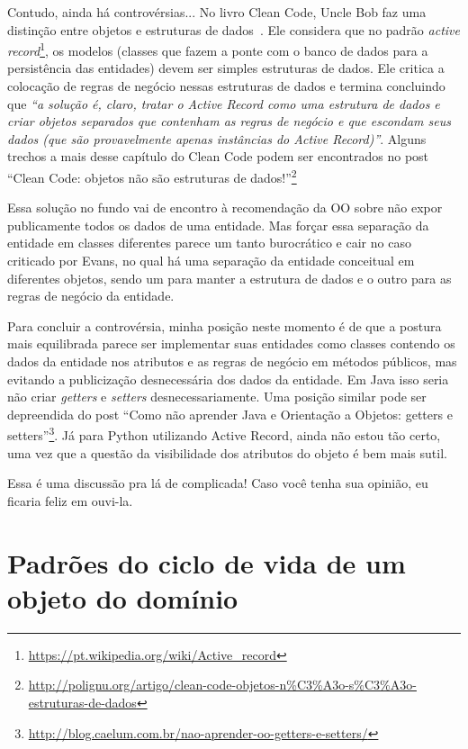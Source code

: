 \documentclass[a4paper, 12pt]{article}
\newcommand{\citacao}[1]{\emph{``#1''}}
\begin{document}
Contudo, ainda há controvérsias... No livro Clean Code, Uncle Bob faz uma distinção entre objetos e estruturas de dados~\cite{Bob2008DataStructures}. Ele considera que no padrão \emph{active record}\footnote{\url{https://pt.wikipedia.org/wiki/Active_record}}, os modelos (classes que fazem a ponte com o banco de dados para a persistência das entidades) devem ser simples estruturas de dados. Ele critica a colocação de regras de negócio nessas estruturas de dados e termina concluindo que \citacao{a solução é, claro, tratar o Active Record como uma estrutura de dados e criar objetos separados que contenham as regras de negócio e que escondam seus dados (que são provavelmente apenas instâncias do Active Record)}. Alguns trechos a mais desse capítulo do Clean Code podem ser encontrados no post ``Clean Code: objetos não são estruturas de dados!''\footnote{\url{http://polignu.org/artigo/clean-code-objetos-n\%C3\%A3o-s\%C3\%A3o-estruturas-de-dados}} 

Essa solução no fundo vai de encontro à recomendação da OO sobre não expor publicamente todos os dados de uma entidade. Mas forçar essa separação da entidade em classes diferentes parece um tanto burocrático e cair no caso criticado por Evans, no qual há uma separação da entidade conceitual em diferentes objetos, sendo um para manter a estrutura de dados e o outro para as regras de negócio da entidade.

Para concluir a controvérsia, minha posição neste momento é de que a postura mais equilibrada parece ser implementar suas entidades como classes contendo os dados da entidade nos atributos e as regras de negócio em métodos públicos, mas evitando a publicização desnecessária dos dados da entidade. Em Java isso seria não criar \emph{getters} e \emph{setters} desnecessariamente. Uma posição similar pode ser depreendida do post ``Como não aprender Java e Orientação a Objetos: getters e setters''\footnote{\url{http://blog.caelum.com.br/nao-aprender-oo-getters-e-setters/}}. Já para Python utilizando Active Record, ainda não estou tão certo, uma vez que a questão da visibilidade dos atributos do objeto é bem mais sutil. 

Essa é uma discussão pra lá de complicada! Caso você tenha sua opinião, eu ficaria feliz em ouvi-la.

\section{Padrões do ciclo de vida de um objeto do domínio}
\end{document}
